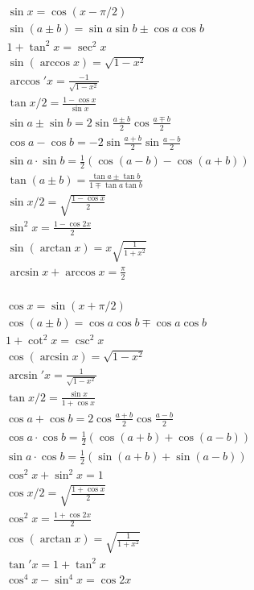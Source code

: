 \begin{minipage}{0.55\textwidth}
\begin{equation}
\begin{split}
    & \sin{x} = \cos{(x-\pi/2)}\\
    & \sin{(a\pm b)} = \sin{a}\sin{b}\pm\cos{a}\cos{b}\\
    & 1+\tan^2{x} = \sec^2{x}\\
    & \sin{(\arccos{x})} = \sqrt{1-x^2}\\
    & \arccos'{x} = \frac{-1}{\sqrt{1-x^2}}\\
    & \tan{x/2} = \frac{1-\cos{x}}{\sin{x}}\\
    & \sin{a}\pm\sin{b} = 2\sin{\frac{a\pm b}{2}}\cos{\frac{a\mp b}{2}}\\
    & \cos{a}-\cos{b} = -2\sin{\frac{a+b}{2}}\sin{\frac{a-b}{2}}\\
    & \sin{a}\cdot\sin{b} = \frac{1}{2}(\cos{(a-b)}-\cos{(a+b)})\\
    & \tan{(a\pm b)}=\frac{\tan{a}\pm\tan{b}}{1\mp \tan{a}\tan{b}}\\
    & \sin{x/2}=\sqrt{\frac{1-\cos{x}}{2}}\\
    & \sin^2{x}=\frac{1-\cos{2x}}{2}\\
    & \sin{(\arctan{x})} = x\sqrt{\frac{1}{1+x^2}}\\
    &\arcsin{x}+\arccos{x}=\frac{\pi}{2}\\
\end{split}
\nonumber
\end{equation}
\end{minipage}
\begin{minipage}{0.55\textwidth}
\begin{equation}
\begin{split}
    & \cos{x} = \sin{(x+\pi/2)}\\
    & \cos{(a\pm b)} = \cos{a}\cos{b}\mp\cos{a}\cos{b}\\
    & 1+\cot^2{x} = \csc^2{x}\\
    & \cos{(\arcsin{x})} = \sqrt{1-x^2}\\
    & \arcsin'{x} = \frac{1}{\sqrt{1-x^2}}\\
    & \tan{x/2} = \frac{\sin{x}}{1+\cos{x}}\\
    & \cos{a}+\cos{b} = 2\cos{\frac{a+b}{2}}\cos{\frac{a-b}{2}}\\
    & \cos{a}\cdot\cos{b} = \frac{1}{2}(\cos{(a+b)}+\cos{(a-b)})\\
    & \sin{a}\cdot\cos{b} = \frac{1}{2}(\sin{(a+b)}+\sin{(a-b)})\\
    & \cos^2{x}+\sin^2{x} = 1\\
    & \cos{x/2}=\sqrt{\frac{1+\cos{x}}{2}}\\
    & \cos^2{x}=\frac{1+\cos{2x}}{2}\\
    & \cos{(\arctan{x})} = \sqrt{\frac{1}{1+x^2}}\\
    & \tan'{x}=1+\tan^2{x}\\
    & \cos^4{x}-\sin^4{x}=\cos{2x}\\
\end{split}
\nonumber
\end{equation}
\end{minipage}


